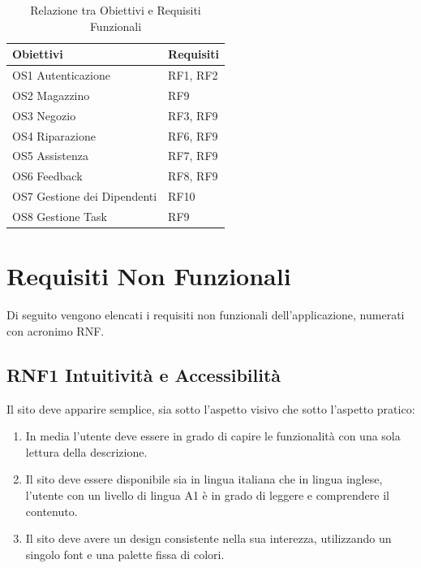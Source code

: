 \documentclass{report}
\begin{document}
\begin{table}[h]
\begin{center} %
	\centering
	\begin{tabular}{ |p{4cm}|p{4cm}|  }
		\hline
		\centering Obiettivi & \qquad\qquad Requisiti \\ %
		\hline
		OS1 Autenticazione & RF1, RF2 \\
		\hline
		OS2 Magazzino & RF9 \\
		\hline
		OS3 Negozio &
		RF3, RF9 \\
		\hline
		OS4 Riparazione & RF6, RF9\\
		\hline
		OS5 Assistenza & RF7, RF9 \\
		\hline
		OS6 Feedback & RF8, RF9 \\
		\hline
		OS7 Gestione dei Dipendenti & RF10 \\
		\hline
		OS8 Gestione Task & RF9 \\
		\hline
	\end{tabular}
\caption{Relazione tra Obiettivi e Requisiti Funzionali}
\end{center}
\end{table}


\section{Requisiti Non Funzionali}
Di seguito vengono elencati i requisiti non funzionali dell’applicazione, numerati con acronimo RNF.

\subsection*{RNF1 Intuitività e Accessibilità}
Il sito deve apparire semplice, sia sotto l'aspetto visivo che sotto l'aspetto pratico:
\begin{enumerate}
	\item In media l’utente deve essere in grado di capire le funzionalità con una sola lettura della descrizione.
	\item Il sito deve essere disponibile sia in lingua italiana che in lingua inglese, l’utente con un livello di lingua A1 è in grado di leggere e comprendere il contenuto.
	\item Il sito deve avere un design consistente nella sua interezza, utilizzando un singolo font e una palette fissa di colori.
\end{enumerate}
\end{document}

